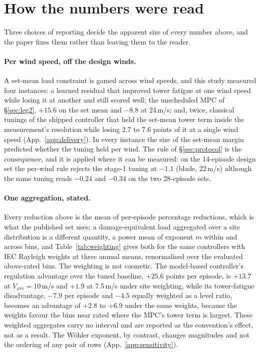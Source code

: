 \documentclass{article}
\begin{document}
\section{How the numbers were read}
\label{sec:discipline}

Three choices of reporting decide the apparent size of every number above, and the paper fixes them rather than leaving them to the reader.

\paragraph{Per wind speed, off the design winds.} A set-mean load constraint is gamed across wind speeds, and this study measured four instances: a learned residual that improved tower fatigue at one wind speed while losing it at another and still scored well; the unscheduled MPC of §\ref{sec:leg2}, $+15.6$ on the set mean and $-8.8$ at 24\,m/s; and, twice, classical tunings of the shipped controller that held the set-mean tower term inside the measurement's resolution while losing 2.7 to 7.6 points of it at a single wind speed (App.~\ref{app:delivery}). In every instance the size of the set-mean margin predicted whether the tuning held per wind. The rule of §\ref{sec:protocol} is the consequence, and it is applied where it can be measured: on the 14-episode design set the per-wind rule rejects the stage-1 tuning at $-1.1$ (blade, 22\,m/s) although the same tuning reads $-0.24$ and $-0.34$ on the two 28-episode sets.

\paragraph{One aggregation, stated.} Every reduction above is the mean of per-episode percentage reductions, which is what the published set uses; a damage-equivalent load aggregated over a site distribution is a different quantity, a power mean of exponent $m$ within and across bins, and Table~\ref{tab:weighting} gives both for the same controllers with IEC Rayleigh weights at three annual means, renormalised over the evaluated above-rated bins. The weighting is not cosmetic. The model-based controller's regulation advantage over the tuned baseline, $+25.6$ points per episode, is $+13.7$ at $V_{\mathrm{ave}}=10$\,m/s and $+1.9$ at 7.5\,m/s under site weighting, while its tower-fatigue disadvantage, $-7.9$ per episode and $-4.5$ equally weighted as a level ratio, becomes an advantage of $+2.8$ to $+6.9$ under the same weights, because the weights favour the bins near rated where the MPC's tower term is largest. These weighted aggregates carry no interval and are reported as the convention's effect, not as a result. The W\"ohler exponent, by contrast, changes magnitudes and not the ordering of any pair of rows (App.~\ref{app:sensitivity}).
\end{document}
